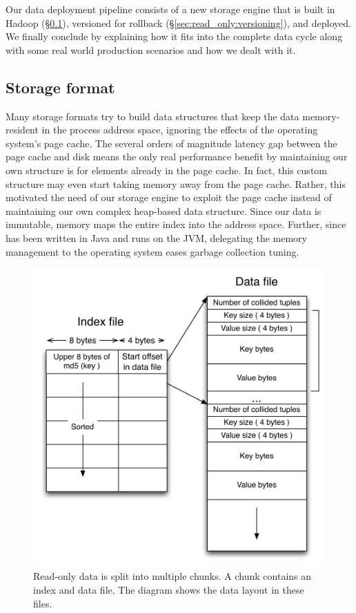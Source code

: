 Our data deployment pipeline consists of a new storage engine that
is built in Hadoop (\S\ref{sec:read_only:storage_format}), versioned
for rollback (\S\ref{sec:read_only:versioning}), and deployed. We
finally conclude by explaining how it fits into the complete data 
cycle along with some real world production scenarios and
how we dealt with it. 


\subsection{Storage format}
\label{sec:read_only:storage_format}

Many storage formats try to build data structures that keep the data
memory-resident in the process address space, ignoring the effects of
the operating system's page cache. The several orders of magnitude 
latency gap between the page cache and disk means the only real 
performance benefit by maintaining our own structure is for elements 
already in the page cache. In fact, this custom structure may even 
start taking memory away from the page cache. Rather, this motivated 
the need of our storage engine to exploit the page cache instead of 
maintaining our own complex heap-based data structure. Since our data is immutable, 
\projectname{} memory maps the entire index into the address space. 
Further, since \projectname{} has been written in Java and runs on 
the JVM, delegating the memory management to the operating system 
eases garbage collection tuning.

\begin{figure}
  \centering
    \includegraphics[scale=0.45]{images/storage_format.pdf}
  \caption{Read-only data is split into multiple chunks. A chunk contains an index and data file. The diagram shows the data layout in these files.}
  \label{storage_format}
\end{figure}

